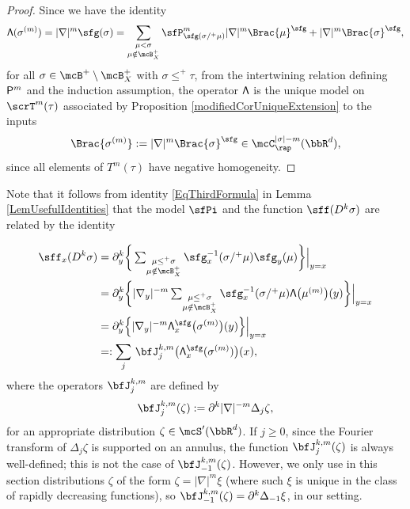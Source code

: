 \begin{proof}
Since we have the identity
\[
{\sf\Lambda}(\sigma^{(m)}) = |\nabla|^m\sfg(\sigma) = \sum_{\substack{\mu<\sigma\\\mu\notin\mcB_X^+}}\sfP^m_{\sfg(\sigma/^+\mu)}|\nabla|^m \Brac{\mu}^\sfg + |\nabla|^m\Brac{\sigma}^\sfg,
\]
for all $\sigma\in\mcB^+\setminus\mcB_X^+$ with $\sigma\le^+\tau$, from the intertwining relation defining ${\sf P}^m$ and the induction assumption, the operator $\sf\Lambda$ is the unique model on $\scrT^m(\tau)$ associated by Proposition \ref{modifiedCorUniqueExtension} to the inputs
\[
\Brac{\sigma^{(m)}}:=|\nabla|^m\Brac{\sigma}^\sfg\in \mcC_\rap^{|\sigma|-m}(\bbR^d),
\]
since all elements of $T^m(\tau)$ have negative homogeneity.
\end{proof}

Note that it follows from identity \eqref{EqThirdFormula} in Lemma \ref{LemUsefulIdentities} that the model $\sfPi$ and the function $\sff(D^k\sigma)$ are related by the identity

\begin{equation} \label{formula:f_xD^k}
\begin{split}
\sff_x(D^k\sigma) &= \partial_y^k\bigg\{\textstyle\sum_{\substack{\mu\leq^+\sigma\\\mu\notin\mcB_X^+}}\sfg_x^{-1}(\sigma/^+\mu)\sfg_y(\mu)\bigg\}\Big|_{y=x} \\
&= \partial_y^k\bigg\{|\nabla_y|^{-m} \textstyle\sum_{\substack{\mu\leq^+\sigma\\\mu\notin\mcB_X^+}}\sfg_x^{-1}(\sigma/^+\mu) {\sf\Lambda}\bigl(\mu^{(m)}\bigr)(y)\bigg\}\Big|_{y=x} \\
&= \partial_y^k\Bigl\{|\nabla_y|^{-m} {\sf\Lambda}^{\sfg}_x\bigl(\sigma^{(m)}\bigr)(y)\Bigr\}\Big|_{y=x} \\
&=: \sum_j\, \bfJ_j^{k,m}\bigl({\sf\Lambda}^{\sfg}_x(\sigma^{(m)})\bigr)(x),
\end{split}
\end{equation}
where the operators $\bfJ_j^{k,m}$ are defined by
\[
\bfJ_j^{k,m}(\zeta) := \partial^k|\nabla|^{-m}\Delta_j\zeta,
\]
for an appropriate distribution $\zeta\in\mcS'(\bbR^d)$. If $j\ge0$, since the Fourier transform of $\Delta_j\zeta$ is supported on an annulus, the function $\bfJ_j^{k,m}(\zeta)$ is always well-defined; this is not the case of $\bfJ_{-1}^{k,m}(\zeta)$. However, we only use in this section distributions $\zeta$ of the form $\zeta=|\nabla|^m\xi$ (where such $\xi$ is unique in the class of rapidly decreasing functions), so $\bfJ_{-1}^{k,m}(\zeta)=\partial^k\Delta_{-1}\xi$, in our setting.

